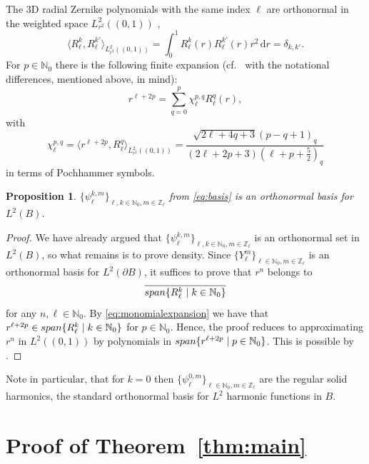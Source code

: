 \documentclass[reqno]{amsart}
\numberwithin{equation}{section}
\numberwithin{figure}{section}
\numberwithin{table}{section}
\theoremstyle{plain}
\newtheorem{proposition}[theorem]{Proposition}
\theoremstyle{definition}
\theoremstyle{remark}
\newcommand{\inner}[1]{\langle#1\rangle}
\newcommand{\spanm}{\mathop{\textup{span}}}
\newcommand{\di}{\mathrm{d}}   %
\newcommand{\N}{\mathbb{N}}
\newcommand{\Z}{\mathbb{Z}}
\begin{document}
The 3D radial Zernike polynomials with the same index $\ell$ are orthonormal in the weighted space $L^2_{r^2}((0,1))$ \cite[Eq.~(33)]{Mathar2009}, 
%
\begin{equation*}
    \inner{R_\ell^k,R_\ell^{k'}}_{L^2_{r^2}((0,1))} = \int_0^1 R_\ell^k(r)R_\ell^{k'}\!(r)r^2\,\di r = \delta_{k,k'}.
\end{equation*}
%
For $p\in\N_0$ there is the following finite expansion (cf.~\cite[Eqs.~(39) and~(40)]{Mathar2009} with the notational differences, mentioned above, in mind):
%
\begin{equation} \label{eq:monomialexpansion}
    r^{\ell+2p} = \sum_{q = 0}^{p}\chi_{\ell}^{p,q}R_{\ell}^q(r),
\end{equation}
%
with
%
\begin{equation} \label{eq:chi}
    \chi_{\ell}^{p,q} = \inner{r^{\ell+2p},R_{\ell}^q}_{L^2_{r^2}((0,1))} = \frac{\sqrt{2\ell+4q+3}(p-q+1)_q}{(2\ell+2p+3)(\ell+p+\tfrac{5}{2})_q}
\end{equation}
%
in terms of Pochhammer symbols.
%
\begin{proposition} \label{prop:basis}
    $\{\psi_{\ell}^{k,m}\}_{\ell,k\in\N_0, m\in\Z_\ell}$ from \eqref{eq:basis} is an orthonormal basis for $L^2(B)$.
\end{proposition}
%
\begin{proof}
    We have already argued that $\{\psi_{\ell}^{k,m}\}_{\ell,k\in\N_0, m\in\Z_\ell}$ is an orthonormal set in $L^2(B)$, so what remains is to prove density. Since $\{Y_{\ell}^m\}_{\ell\in\N_0,m\in\Z_\ell}$ is an orthonormal basis for $L^2(\partial B)$, it suffices to prove that $r^n$ belongs to
    \begin{equation*}
        \overline{\spanm\{R_{\ell}^{k} \mid k\in\N_0\}}
    \end{equation*}
    for any $n,\ell\in\N_0$. By \eqref{eq:monomialexpansion} we have that $r^{\ell+2p} \in \spanm\{R_{\ell}^{k} \mid k\in\N_0\}$ for $p\in \N_0$. Hence, the proof reduces to approximating $r^n$ in $L^2((0,1))$ by polynomials in $\spanm\{r^{\ell+2p} \mid p\in\N_0\}$. This is possible by \cite[Lemma~6.1]{Garde2024a}.
\end{proof}
%
Note in particular, that for $k=0$ then $\{\psi_{\ell}^{0,m}\}_{\ell\in\N_0, m\in\Z_\ell}$ are the regular solid harmonics, the standard orthonormal basis for $L^2$ harmonic functions in $B$.

\section{Proof of Theorem~\ref{thm:main}} \label{sec:proofthm}
	
\end{document}
